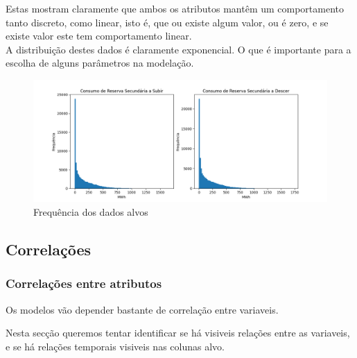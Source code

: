 Estas mostram claramente que ambos os atributos mantêm um comportamento tanto discreto, como linear, isto é, que ou existe algum valor, ou é zero, e se existe valor este tem comportamento linear.\\
A distribuição destes dados é claramente exponencial. O que é importante para a escolha de alguns parâmetros na modelação. \\

		
\begin{figure}[H]
  \centering
  \includegraphics[width=\textwidth]{plots/target_histograms.png}
  \caption{Frequência dos dados alvos}
  \label{fig:targethistograms}
\end{figure}


\subsection{Correlações}

\subsubsection{Correlações entre atributos}

Os modelos vão depender bastante de correlação entre variaveis.

Nesta secção queremos tentar identificar se há visiveis relações entre as variaveis, e se há relações temporais  visiveis nas colunas alvo.



